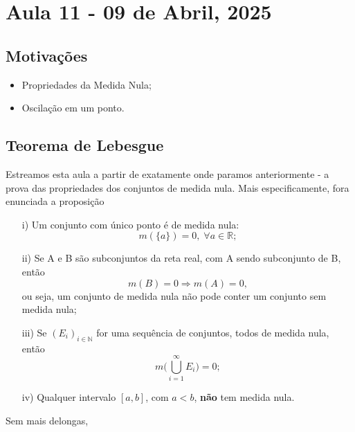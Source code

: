 \documentclass[../analysisII_notes.tex]{subfiles}
\begin{document}
\section{Aula 11 - 09 de Abril, 2025}
\subsection{Motivações}
\begin{itemize}
	\item Propriedades da Medida Nula;
	\item Oscilação em um ponto.
\end{itemize}
\subsection{Teorema de Lebesgue}
Estreamos esta aula a partir de exatamente onde paramos anteriormente - a prova das propriedades dos conjuntos de medida nula. Mais especificamente, fora enunciada a proposição
\begin{prop*}
	\begin{itemize}
		\item[i)] Um conjunto com único ponto é de medida nula:
		      \[
			      m(\{a\}) = 0,\; \forall a\in \mathbb{R};
		      \]
		\item[ii)] Se A e B são subconjuntos da reta real, com A sendo subconjunto de B, então
		      \[
			      m(B) = 0 \Rightarrow m(A) = 0,
		      \]
		      ou seja, um conjunto de medida nula não pode conter um conjunto sem medida nula;
		\item[iii)] Se \((E_{i})_{i\in \mathbb{N}}\) for uma sequência de conjuntos, todos de medida nula, então
		      \[
			      m \biggl(\bigcup_{i=1}^{\infty}E_{i}\biggr) = 0;
		      \]
		\item[iv)] Qualquer intervalo \([a, b]\), com \(a < b\), \textbf{não} tem medida nula.
	\end{itemize}
\end{prop*}
Sem mais delongas,
\end{document}

